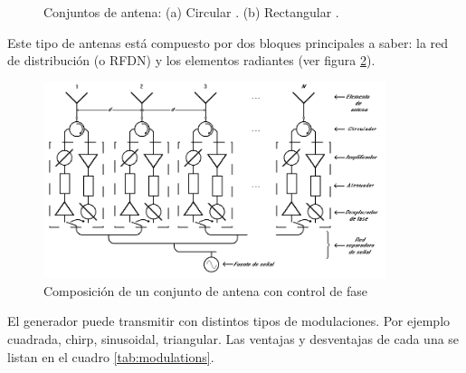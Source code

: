 \begin{figure}[H]
	\centering
		\caption{Conjuntos de antena: (a) Circular \cite{Bapna1996}. (b) Rectangular \cite{Aumann1989}.}
	\label{fig:phasedArrayAntenna}
\end{figure}

Este tipo de antenas está compuesto por dos bloques principales a saber: la red de distribución (o RFDN) y los elementos 
radiantes (ver figura \ref{fig:compositionAntenna}).

\begin{figure}[H]
 \centering
 \includegraphics[width=10cm]{gfx/CompositionAntenna.png}
 \caption{Composición de un conjunto de antena con control de fase}
 \label{fig:compositionAntenna}
\end{figure}

El generador puede transmitir con distintos tipos de modulaciones. Por ejemplo cuadrada, chirp, sinusoidal, triangular. Las ventajas y
desventajas de cada una se listan en el cuadro \ref{tab:modulations}.

